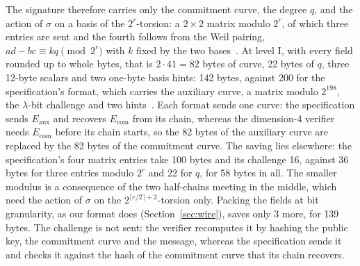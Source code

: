 \documentclass[version=preprint]{iacrcc}
\newcommand{\Ecom}{E_{\mathrm{com}}}
\newcommand{\Eaux}{E_{\mathrm{aux}}}
\begin{document}
    The signature therefore carries only the commitment curve, the degree $q$,
    and the action of $\sigma$ on a basis of the $2^r$-torsion: a $2 \times 2$
    matrix modulo $2^r$, of which three entries are sent and the fourth follows
    from the Weil pairing, $ad - bc \equiv kq \pmod{2^r}$ with $k$ fixed by
    the two bases~\cite[Section 6.1]{DLRW24}. At level I, with every field rounded up to whole
    bytes, that is $2 \cdot 41 = 82$ bytes of curve, 22 bytes of $q$, three
    12-byte scalars and two one-byte basis hints: 142 bytes, against 200 for
    the specification's format, which carries the auxiliary curve, a matrix
    modulo $2^{198}$, the $\lambda$-bit challenge and two hints~\cite[Chapter
    6]{AAA+26}. Each format sends one curve: the specification sends $\Eaux$
    and recovers $\Ecom$ from its chain, whereas the dimension-4 verifier needs
    $\Ecom$ before its chain starts, so the 82 bytes of the auxiliary curve are
    replaced by the 82 bytes of the commitment curve. The saving lies
    elsewhere: the specification's four matrix entries take 100 bytes and its
    challenge 16, against 36 bytes for three entries modulo $2^r$ and 22 for
    $q$, for 58 bytes in all. The smaller modulus is a consequence of the two
    half-chains meeting in the middle, which need the action of $\sigma$ on the
    $2^{\lceil e/2 \rceil + 2}$-torsion only. Packing the fields at bit
    granularity, as our format does (Section~\ref{sec:wire}), saves only 3
    more, for 139 bytes. The challenge is not sent: the verifier recomputes it
    by hashing the public key, the commitment curve and the message, whereas
    the specification sends it and checks it against the hash of the
    commitment curve that its chain recovers.
\end{document}
